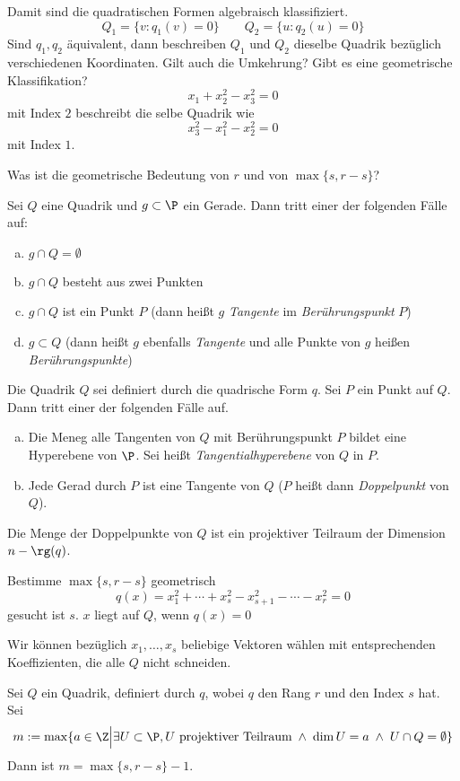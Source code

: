 \documentclass[a4paper, 10pt]{scrbook}
\begin{document}
Damit sind die quadratischen Formen algebraisch klassifiziert.
\[
	Q_1 = \{v: q_1(v) = 0\} \qquad Q_2=\{u: q_2(u) = 0\}
\]
Sind $q_1,q_2$ äquivalent, dann beschreiben $Q_1$ und $Q_2$ dieselbe Quadrik bezüglich verschiedenen Koordinaten.
Gilt auch die Umkehrung?
Gibt es eine geometrische Klassifikation?
\[
	x_1 + x_2^2 - x_3^2 =0
\]
mit Index $2$ beschreibt die selbe Quadrik wie
\[
	x_3^2 - x_1^2 -x_2^2 = 0
\]
mit Index $1$.

Was ist die geometrische Bedeutung von $r$ und von $\max\{s,r-s\}$?

\begin{prop}
	\label{prop:15.11}
	Sei $Q$ eine Quadrik und $g\subset \P$ ein Gerade.
	Dann tritt einer der folgenden Fälle auf:
	\begin{enumerate}[(a)]
		\item
			$g\cap Q = \emptyset$
		\item
			$g\cap Q$ besteht aus zwei Punkten
		\item
			$g \cap Q$ ist ein Punkt $P$ (dann heißt $g$ \emph{Tangente} im \emph{Berührungspunkt} $P$)
		\item
			$g \subset Q$ (dann heißt $g$ ebenfalls \emph{Tangente} und alle Punkte von $g$ heißen \emph{Berührungspunkte})
	\end{enumerate}
\end{prop}

\begin{prop}
	\label{prop:15.12}
	Die Quadrik $Q$ sei definiert durch die quadrische Form $q$.
	Sei $P$ ein Punkt auf $Q$.
	Dann tritt einer der folgenden Fälle auf.
	\begin{enumerate}[(a)]
		\item 
			Die Meneg alle Tangenten von $Q$ mit Berührungspunkt $P$ bildet eine Hyperebene von $\P$.
			Sei heißt \emph{Tangentialhyperebene} von $Q$ in $P$.
		\item
			Jede Gerad durch $P$ ist eine Tangente von $Q$ ($P$ heißt dann \emph{Doppelpunkt} von $Q$).
	\end{enumerate}
	Die Menge der Doppelpunkte von $Q$ ist ein projektiver Teilraum der Dimension $n-\rg(q)$.
\end{prop}

Bestimme $\max\{s,r-s\}$ geometrisch
\[
	q(x) = x_1^2 + \dotsb + x_s^2 - x_{s+1}^2 - \dotsb - x_r^2 = 0
\]
gesucht ist $s$.
$x$ liegt auf $Q$, wenn $q(x)=0$

Wir können bezüglich $x_1,\dotsc,x_s$ beliebige Vektoren wählen mit entsprechenden Koeffizienten, die alle $Q$ nicht schneiden.

\begin{prop}
	\label{prop:15.13}
	Sei $Q$ ein Quadrik, definiert durch $q$, wobei $q$ den Rang $r$ und den Index $s$ hat.
	Sei
	\[
		m := \max\{ a\in \Z \Big| \exists U \subset \P, U \text{ projektiver Teilraum}\; \land\; \dim U = a \;\land\; U \cap Q = \emptyset\}
	\]
	Dann ist $m=\max\{s,r-s\}-1$.
\end{prop}
\end{document}
